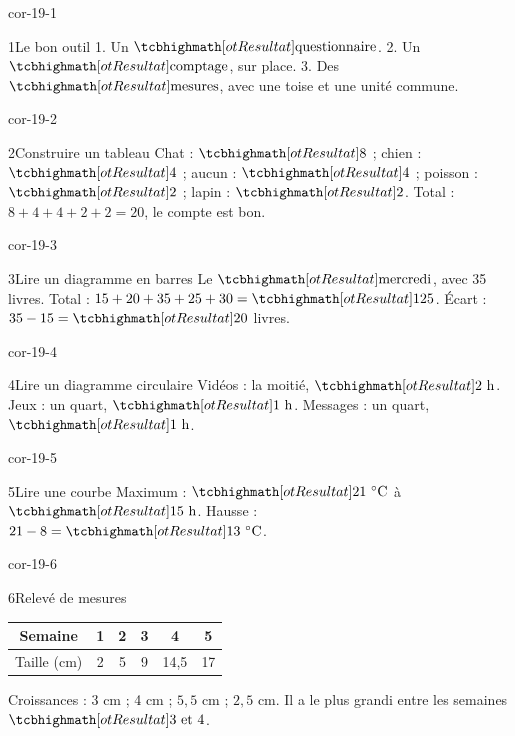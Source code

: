 \clearpage\pagestyle{otMain}\setlength{\otBlocEspacement}{2.5mm}\fontsize{11}{15}\selectfont{}
\begin{blocLivre}{cor-19-1}\begin{corrige}{1}{Le bon outil}
1. Un $\res{\text{questionnaire}}$. 2. Un $\res{\text{comptage}}$, sur place. 3. Des $\res{\text{mesures}}$, avec une toise et une unité commune.
\end{corrige}\end{blocLivre}
\begin{blocLivre}{cor-19-2}\begin{corrige}{2}{Construire un tableau}
Chat : $\res8$ ; chien : $\res4$ ; aucun : $\res4$ ; poisson : $\res2$ ; lapin : $\res2$. Total : $8+4+4+2+2=20$, le compte est bon.
\end{corrige}\end{blocLivre}
\begin{blocLivre}{cor-19-3}\begin{corrige}{3}{Lire un diagramme en barres}
Le $\res{\text{mercredi}}$, avec 35 livres. Total : $15+20+35+25+30=\res{125}$. Écart : $35-15=\res{20}$ livres.
\label{fig-cor-19-3}
\end{corrige}\end{blocLivre}
\begin{blocLivre}{cor-19-4}\begin{corrige}{4}{Lire un diagramme circulaire}
Vidéos : la moitié, $\res{2\text{ h}}$. Jeux : un quart, $\res{1\text{ h}}$. Messages : un quart, $\res{1\text{ h}}$.
\label{fig-cor-19-4}
\end{corrige}\end{blocLivre}
\begin{blocLivre}{cor-19-5}\begin{corrige}{5}{Lire une courbe}
Maximum : $\res{21\ ^\circ\mathrm{C}}$ à $\res{15\text{ h}}$. Hausse : $21-8=\res{13\ ^\circ\mathrm{C}}$.
\label{fig-cor-19-5}
\end{corrige}\end{blocLivre}
\begin{blocLivre}{cor-19-6}\begin{corrige}{6}{Relevé de mesures}
\begin{center}\renewcommand{\arraystretch}{1.35}\begin{tabular}{c|ccccc}\toprule
Semaine & 1 & 2 & 3 & 4 & 5\\\midrule
Taille (cm) & 2 & 5 & 9 & 14,5 & 17\\
\bottomrule\end{tabular}\end{center}Croissances : 3 cm ; 4 cm ; $5{,}5$ cm ; $2{,}5$ cm. Il a le plus grandi entre les semaines $\res{3\text{ et }4}$.
\end{corrige}\end{blocLivre}
